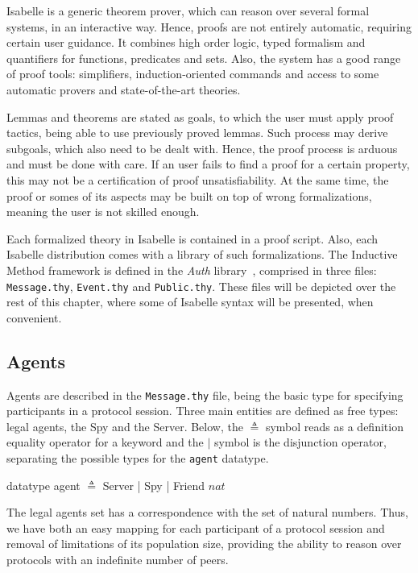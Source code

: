 Isabelle is a generic theorem prover, which can reason over several formal systems, in an interactive way. Hence, proofs are not entirely automatic, requiring certain user guidance. It combines high order logic, typed formalism and quantifiers for functions, predicates and sets. Also, the system has a good range of proof tools: simplifiers, induction-oriented commands and access to some automatic provers and state-of-the-art theories.

Lemmas and theorems are stated as goals, to which the user must apply proof tactics, being able to use previously proved lemmas. Such process may derive subgoals, which also need to be dealt with. Hence, the proof process is arduous and must be done with care. If an user fails to find a proof for a certain property, this may not be a certification of proof unsatisfiability. At the same time, the proof or somes of its aspects may be built on top of wrong formalizations, meaning the user is not skilled enough.

Each formalized theory in Isabelle is contained in a proof script. Also, each Isabelle distribution comes with a library of such formalizations. The Inductive Method framework is defined in the \textit{Auth} library~\cite{isabelle-hol-auth}, comprised in three files: \texttt{Message.thy}, \texttt{Event.thy} and \texttt{Public.thy}. These files will be depicted over the rest of this chapter, where some of Isabelle syntax will be presented, when convenient.



\subsection{Agents}
Agents are described in the \texttt{Message.thy} file, being the basic type for specifying participants in a protocol session. Three main entities are defined as free types: legal agents, the Spy and the Server. Below, the \( \triangleq \) symbol reads as a definition equality operator for a keyword and the \(|\) symbol is the disjunction operator, separating the possible types for the \texttt{agent} datatype.

\begin{center}
  {\ttfamily datatype agent \( \triangleq \) Server | Spy | Friend \(nat\)}
\end{center}

The legal agents set has a correspondence with the set of natural numbers. Thus, we have both an easy mapping for each participant of a protocol session and removal of limitations of its population size, providing the ability to reason over protocols with an indefinite number of peers.

